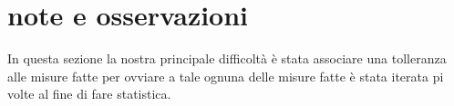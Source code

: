 \section{note e osservazioni}
In questa sezione la nostra principale difficoltà
è stata associare una tolleranza alle misure fatte
per ovviare a tale ognuna delle misure fatte è
stata iterata pi volte al fine di fare statistica.
 